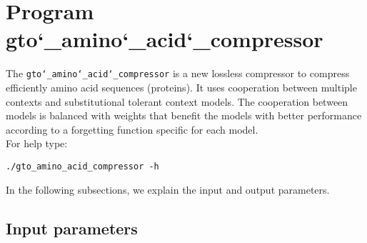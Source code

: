 \section{Program gto\char`_amino\char`_acid\char`_compressor}
The \texttt{gto\char`_amino\char`_acid\char`_compressor} is a new lossless compressor to compress efficiently amino acid sequences (proteins). It uses cooperation between multiple contexts and substitutional tolerant context models. The cooperation between models is balanced with weights that benefit the models with better performance according to a forgetting function specific for each model.\\
For help type:
\begin{lstlisting}
./gto_amino_acid_compressor -h
\end{lstlisting}
In the following subsections, we explain the input and output parameters.

\subsection*{Input parameters}

